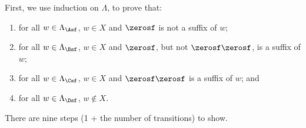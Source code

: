 First, we use induction on $\Lambda$, to prove that:
\begin{enumerate}[\quad(A)]
\item for all $w\in\Lambda_\Asf$, $w\in X$ and $\zerosf$ is not a
  suffix of $w$;

\item for all $w\in\Lambda_\Bsf$, $w\in X$ and $\zerosf$, but not
  $\zerosf\zerosf$, is a suffix of $w$;

\item for all $w\in\Lambda_\Csf$, $w\in X$ and $\zerosf\zerosf$ is a
  suffix of $w$; and

\item for all $w\in\Lambda_\Dsf$, $w\not\in X$.
\end{enumerate}

There are nine steps (1 + the number of transitions) to show.

